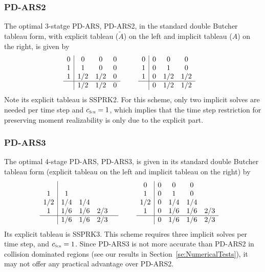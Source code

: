 \subsubsection{PD-ARS2}

The optimal 3-statge PD-ARS, PD-ARS2, in the standard double Butcher tableau form, with explicit tableau ($\tilde{A}$) on the left and implicit tableau ($A$) on the right, is given by
\begin{align}
  &\begin{array}{c | c c c}
  	0 & 0   & 0 & 0 \\
  	1 & 1   & 0 & 0 \\
  	1 & 1/2 & 1/2 & 0 \\ \hline
  	  & 1/2 & 1/2 & 0 
  \end{array}
  \qquad
  \begin{array}{c | c c c}
  	0 & 0 & 0            & 0            \\
  	1 & 0 & 1            & 0            \\
  	1 & 0 & 1/2 & 1/2 \\ \hline
  	  & 0 & 1/2 & 1/2
  \end{array}
\end{align}
Note its explicit tableau is SSPRK2. 
For this scheme, only two implicit solves are needed per time step and $c_{\Sch}= 1$, which implies that the time step restriction for preserving moment realizability is only due to the explicit part.  

\subsubsection{PD-ARS3}

The optimal 4-stage PD-ARS, PD-ARS3, is given in its standard double Butcher tableau form (explicit tableau on the left and implicit tableau on the right) by
\begin{align}
  &\begin{array}{c | c c c c}
  	    &     &     &     &  \\
  	 1  & 1   &     &     &  \\
  	1/2 & 1/4 & 1/4 &  \\
  	 1  & 1/6 & 1/6 & 2/3 &  \\ \hline
  	    & 1/6 & 1/6 & 2/3 &
  \end{array}
  \qquad
  \begin{array}{c | c c c c}
  	0 & 0 & 0            & 0            \\
  	1 & 0 & 1            & 0            \\
  	1/2 & 0 & 1/4 & 1/4 \\ 
  	1 & 0 & 1/6 & 1/6 & 2/3\\\hline
  	  & 0 & 1/6 & 1/6 & 2/3
  \end{array}
\end{align}
Its explicit tableau is SSPRK3. 
This scheme requires three implicit solves per time step, and $c_{\Sch}= 1$.  
Since PD-ARS3 is not more accurate than PD-ARS2 in collision dominated regions (see our results in Section~\ref{se:NumericalTests}), it may not offer any practical advantage over PD-ARS2.  
